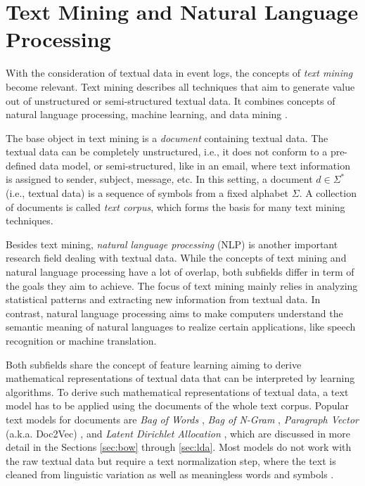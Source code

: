 \section{Text Mining and Natural Language Processing}

With the consideration of textual data in event logs, the concepts of \textit{text mining} become relevant.
Text mining describes all techniques that aim to generate value out of unstructured or semi-structured textual data.
It combines concepts of natural language processing, machine learning, and data mining \cite{DBLP:books/daglib/0022577}.

The base object in text mining is a \textit{document} containing textual data.
The textual data can be completely unstructured, i.e., it does not conform to a pre-defined data model, or semi-structured, like in an email, where text information is assigned to sender, subject, message, etc.
In this setting, a document $d \in \Sigma^*$ (i.e., textual data) is a sequence of symbols from a fixed alphabet $\Sigma$.
A collection of documents is called \textit{text corpus}, which forms the basis for many text mining techniques.

Besides text mining, \textit{natural language processing} (NLP) is another important research field dealing with textual data.
While the concepts of text mining and natural language processing have a lot of overlap, both subfields differ in term of the goals they aim to achieve.
The focus of text mining mainly relies in analyzing statistical patterns and extracting new information from textual data.
In contrast, natural language processing aims to make computers understand the semantic meaning of natural languages to realize certain applications, like speech recognition or machine translation.

Both subfields share the concept of feature learning aiming to derive mathematical representations of textual data that can be interpreted by learning algorithms.
To derive such mathematical representations of textual data, a text model has to be applied using the documents of the whole text corpus.
Popular text models for documents are \textit{Bag of Words} \cite{harris1954distributional}, \textit{Bag of N-Gram} \cite{brown1992class}, \textit{Paragraph Vector} (a.k.a. Doc2Vec) \cite{DBLP:conf/icml/LeM14}, and \textit{Latent Dirichlet Allocation} \cite{DBLP:journals/jmlr/BleiNJ03}, which are discussed in more detail in the Sections \ref{sec:bow} through \ref{sec:lda}.
Most models do not work with the raw textual data but require a text normalization step, where the text is cleaned from linguistic variation as well as meaningless words and symbols \cite{DBLP:books/lib/JurafskyM09}.

